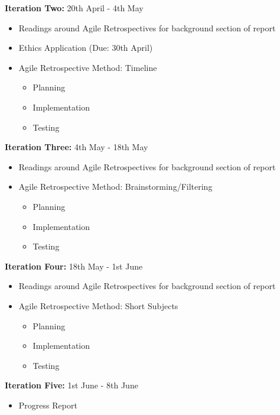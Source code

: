 \documentclass[11pt, a4paper, twoside, openright]{report}
\begin{document}
\noindent
\textbf{Iteration Two:}  20th April - 4th May

\begin{itemize}
\item Readings around Agile Retrospectives for background section of report
\item Ethics Application (Due: 30th April)
\item Agile Retrospective Method: Timeline
	\begin{itemize}
		\item Planning
        \item Implementation
        \item Testing
	\end{itemize}
\end{itemize}

\noindent
\textbf{Iteration Three:}  4th May - 18th May

\begin{itemize}
\item Readings around Agile Retrospectives for background section of report
\item Agile Retrospective Method: Brainstorming/Filtering
	\begin{itemize}
		\item Planning
        \item Implementation
        \item Testing
	\end{itemize}
\end{itemize}

\noindent
\textbf{Iteration Four:}  18th May - 1st June

\begin{itemize}
\item Readings around Agile Retrospectives for background section of report
\item Agile Retrospective Method: Short Subjects
	\begin{itemize}
		\item Planning
        \item Implementation
        \item Testing
	\end{itemize}
\end{itemize}

\noindent
\textbf{Iteration Five:}  1st June - 8th June

\begin{itemize}
\item Progress Report \\
\end{itemize}
\end{document}

